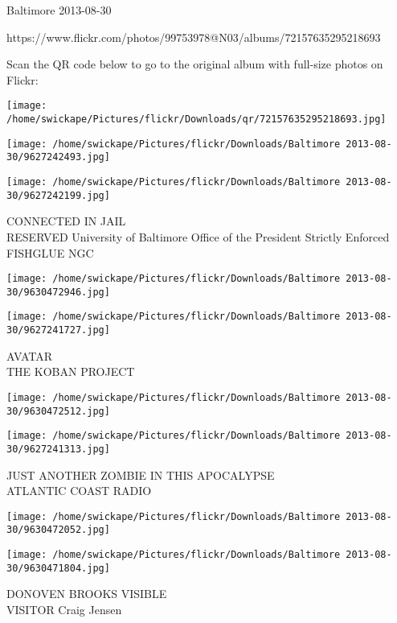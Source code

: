 \documentclass[10pt,letterpaper]{article}
\begin{document}
Baltimore 2013-08-30

https://www.flickr.com/photos/99753978@N03/albums/72157635295218693

Scan the QR code below to go to the original album with full-size photos on Flickr:

\texttt{[image: /home/swickape/Pictures/flickr/Downloads/qr/72157635295218693.jpg]}
\pagebreak

\texttt{[image: /home/swickape/Pictures/flickr/Downloads/Baltimore 2013-08-30/9627242493.jpg]}

\vspace{0.25in}
\texttt{[image: /home/swickape/Pictures/flickr/Downloads/Baltimore 2013-08-30/9627242199.jpg]}

CONNECTED IN JAIL\\
RESERVED University of Baltimore Office of the President Strictly Enforced FISHGLUE NGC\\
\pagebreak

\texttt{[image: /home/swickape/Pictures/flickr/Downloads/Baltimore 2013-08-30/9630472946.jpg]}

\vspace{0.25in}
\texttt{[image: /home/swickape/Pictures/flickr/Downloads/Baltimore 2013-08-30/9627241727.jpg]}

AVATAR\\
THE KOBAN PROJECT\\
\pagebreak

\texttt{[image: /home/swickape/Pictures/flickr/Downloads/Baltimore 2013-08-30/9630472512.jpg]}

\vspace{0.25in}
\texttt{[image: /home/swickape/Pictures/flickr/Downloads/Baltimore 2013-08-30/9627241313.jpg]}

JUST ANOTHER ZOMBIE IN THIS APOCALYPSE\\
ATLANTIC COAST RADIO\\
\pagebreak

\texttt{[image: /home/swickape/Pictures/flickr/Downloads/Baltimore 2013-08-30/9630472052.jpg]}

\vspace{0.25in}
\texttt{[image: /home/swickape/Pictures/flickr/Downloads/Baltimore 2013-08-30/9630471804.jpg]}

DONOVEN BROOKS VISIBLE\\
VISITOR Craig Jensen\\
\pagebreak
\end{document}
